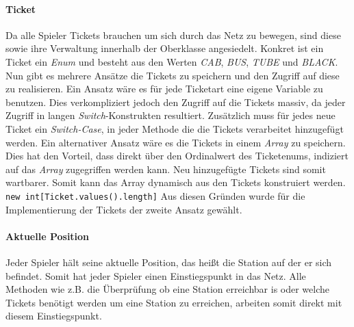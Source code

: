                \paragraph{Ticket}
                    Da alle Spieler Tickets brauchen um sich durch das Netz zu bewegen, sind diese sowie ihre Verwaltung innerhalb
                    der Oberklasse angesiedelt. Konkret ist ein Ticket ein \textit{Enum} und besteht aus den Werten
                    \textit{CAB}, \textit{BUS}, \textit{TUBE} und \textit{BLACK}.
                    Nun gibt es mehrere Ansätze die Tickets zu speichern und den Zugriff auf diese zu realisieren.
                    \newline
                    Ein Ansatz wäre es für jede Ticketart eine eigene Variable zu benutzen.
                    Dies verkompliziert jedoch den Zugriff auf die Tickets massiv, da jeder Zugriff in langen \textit{Switch}-Konstrukten resultiert.
                    Zusätzlich muss für jedes neue Ticket ein \textit{Switch-Case}, in jeder Methode die die Tickets verarbeitet hinzugefügt werden.
                    \newline
                    Ein alternativer Ansatz wäre es die Tickets in einem \textit{Array} zu speichern.
                    Dies hat den Vorteil, dass direkt über den Ordinalwert des Ticketenums, indiziert auf das \textit{Array} zugegriffen werden kann.
                    Neu hinzugefügte Tickets sind somit wartbarer.
                    \newline
                    Somit kann das Array dynamisch aus den Tickets konstruiert werden.
                    \newline
                    \newline
                    \texttt{new int[Ticket.values().length]}
                    \newline
                    \newline
                    Aus diesen Gründen wurde für die Implementierung der Tickets der zweite Ansatz gewählt.

                \paragraph{Aktuelle Position}
                    Jeder Spieler hält seine aktuelle Position, das heißt die Station auf der er sich befindet.
                    Somit hat jeder Spieler einen Einstiegspunkt in das Netz. Alle Methoden wie z.B. die Überprüfung ob eine Station erreichbar is
                    oder welche Tickets benötigt werden um eine Station zu erreichen, arbeiten somit direkt mit diesem Einstiegspunkt.

